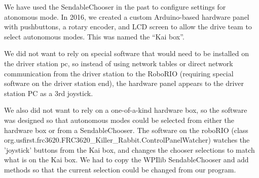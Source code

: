 \documentclass[]{article}
\begin{document}
We have used the SendableChooser in the past to configure settings for atonomous mode. In 2016, we created a custom Arduino-based hardware panel with pushbuttons, a rotary encoder, and LCD screen to allow the drive team to select autonomous modes. This was named the ``Kai box''.

We did not want to rely on special software that would need to be installed on the driver station pc, so instead of using network tables or direct network communication from the driver station to the RoboRIO (requiring special software on the driver station end), the hardware panel appears to the driver station PC as a 3rd joystick.

We also did not want to rely on a one-of-a-kind hardware box, so the software was designed so that autonomous modes could be selected from either the hardware box or from a SendableChooser. The software on the roboRIO (class org.usfirst.frc3620.FRC3620\_Killer\_Rabbit.ControlPanelWatcher) watches the 'joystick' buttons from the Kai box, and changes the chooser selections to match what is on the Kai box. We had to copy the WPIlib SendableChooser and add methods so that the current selection could be changed from our program.
\end{document}
